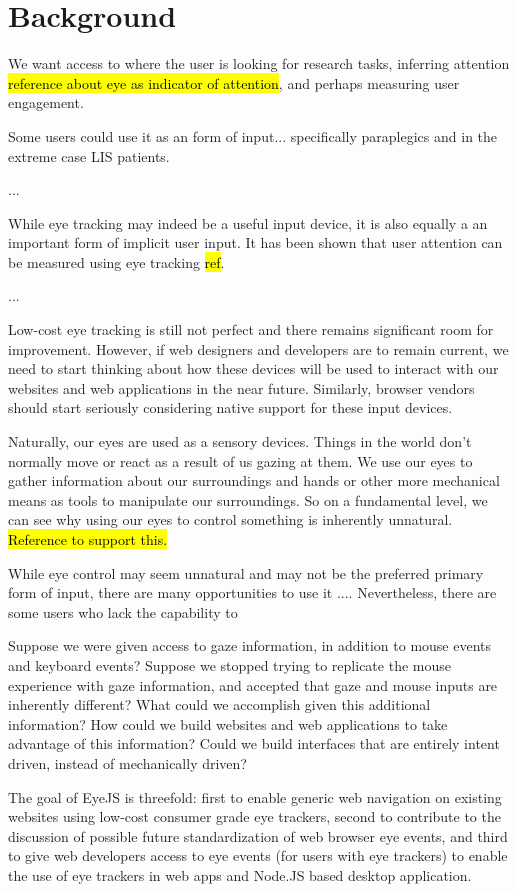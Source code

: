 \section{Background}
We want access to where the user is looking for research tasks, inferring attention \hl{reference about eye as indicator of attention}, and perhaps measuring user engagement.

Some users could use it as an form of input... specifically paraplegics and in the extreme case LIS patients.

...

While eye tracking may indeed be a useful input device, it is also equally a an important form of implicit user input. It has been shown that user attention can be measured using eye tracking \hl{ref}.

...

Low-cost eye tracking is still not perfect and there remains significant room for improvement. However, if web designers and developers are to remain current, we need to start thinking about how these devices will be used to interact with our websites and web applications in the near future. Similarly, browser vendors should start seriously considering native support for these input devices.

Naturally, our eyes are used as a sensory devices. Things in the world don't normally move or react as a result of us gazing at them. We use our eyes to gather information about our surroundings and hands or other more mechanical means as tools to manipulate our surroundings. So on a fundamental level, we can see why using our eyes to control something is inherently unnatural. \hl{Reference to support this.}

While eye control may seem unnatural and may not be the preferred primary form of input, there are many opportunities to use it .... Nevertheless, there are some users who lack the capability to

Suppose we were given access to gaze information, in addition to mouse events and keyboard events? Suppose we stopped trying to replicate the mouse experience with gaze information, and accepted that gaze and mouse inputs are inherently different? What could we accomplish given this additional information? How could we build websites and web applications to take advantage of this information? Could we build interfaces that are entirely intent driven, instead of mechanically driven?



The goal of EyeJS is threefold: first to enable generic web navigation on existing websites using low-cost consumer grade eye trackers, second to contribute to the discussion of possible future standardization of web browser eye events, and third to give web developers access to eye events (for users with eye trackers) to enable the use of eye trackers in web apps and Node.JS based desktop application.




